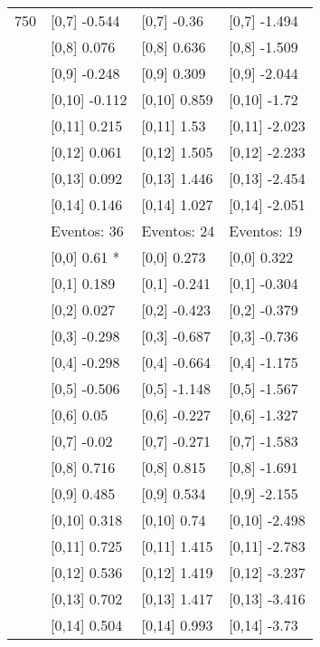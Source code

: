 \begin{table}
\begin{tabular}[t]{llll}
750 & {}[0,7] -0.544 & {}[0,7] -0.36 & {}[0,7] -1.494\\
\addlinespace
 & {}[0,8] 0.076 & {}[0,8] 0.636 & {}[0,8] -1.509\\
 & {}[0,9] -0.248 & {}[0,9] 0.309 & {}[0,9] -2.044\\
 & {}[0,10] -0.112 & {}[0,10] 0.859 & {}[0,10] -1.72\\
 & {}[0,11] 0.215 & {}[0,11] 1.53 & {}[0,11] -2.023\\
 & {}[0,12] 0.061 & {}[0,12] 1.505 & {}[0,12] -2.233\\
\addlinespace
 & {}[0,13] 0.092 & {}[0,13] 1.446 & {}[0,13] -2.454\\
 & {}[0,14] 0.146 & {}[0,14] 1.027 & {}[0,14] -2.051\\
 & Eventos:  36 & Eventos:  24 & Eventos:  19\\
 & {}[0,0] 0.61 * & {}[0,0] 0.273 & {}[0,0] 0.322\\
 & {}[0,1] 0.189 & {}[0,1] -0.241 & {}[0,1] -0.304\\
\addlinespace
 & {}[0,2] 0.027 & {}[0,2] -0.423 & {}[0,2] -0.379\\
 & {}[0,3] -0.298 & {}[0,3] -0.687 & {}[0,3] -0.736\\
 & {}[0,4] -0.298 & {}[0,4] -0.664 & {}[0,4] -1.175\\
 & {}[0,5] -0.506 & {}[0,5] -1.148 & {}[0,5] -1.567\\
 & {}[0,6] 0.05 & {}[0,6] -0.227 & {}[0,6] -1.327\\
\addlinespace
1000 & {}[0,7] -0.02 & {}[0,7] -0.271 & {}[0,7] -1.583\\
 & {}[0,8] 0.716 & {}[0,8] 0.815 & {}[0,8] -1.691\\
 & {}[0,9] 0.485 & {}[0,9] 0.534 & {}[0,9] -2.155\\
 & {}[0,10] 0.318 & {}[0,10] 0.74 & {}[0,10] -2.498\\
 & {}[0,11] 0.725 & {}[0,11] 1.415 & {}[0,11] -2.783\\
\addlinespace
 & {}[0,12] 0.536 & {}[0,12] 1.419 & {}[0,12] -3.237\\
 & {}[0,13] 0.702 & {}[0,13] 1.417 & {}[0,13] -3.416\\
 & {}[0,14] 0.504 & {}[0,14] 0.993 & {}[0,14] -3.73\\
\bottomrule
\end{tabular}
\end{table}

